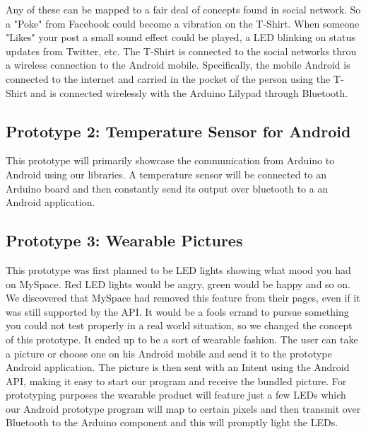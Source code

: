 Any of these can be mapped to a fair deal of concepts found in social network.
So a "Poke" from Facebook could become a vibration on the T-Shirt. When someone "Likes" your post a small sound effect
could be played, a LED blinking on status updates from Twitter, etc. The T-Shirt is connected to the social networks
throu a wireless connection to the Android mobile. Specifically, the mobile Android is connected to the internet
and carried in the pocket of the person using the T-Shirt and is connected wirelessly with the Arduino Lilypad through Bluetooth.
	


	
\subsection{Prototype 2: Temperature Sensor for Android}
This prototype will primarily showcase the communication from Arduino to Android using our libraries.
A temperature sensor will be connected to an Arduino board and then constantly send its output over bluetooth to a
an Android application.
	
\subsection{Prototype 3: Wearable Pictures}
This prototype was first planned to be LED lights showing what mood you had on MySpace. Red LED lights would be angry,
green would be happy and so on. We discovered that MySpace had removed this feature from their pages, even if it was
still supported by the API. It would be a fools errand to pursue something you could not test properly
in a real world situation, so we changed the concept of this prototype. It ended up to be a sort of wearable fashion.
The user can take a picture or choose one on his Android mobile and send it to the prototype Android application.
The picture is then sent with an Intent using the Android API, making it easy to start our program and receive
the bundled picture. For prototyping purposes the wearable product will feature just a few LEDs which our Android
prototype program will map to certain pixels and then transmit over Bluetooth to the Arduino
component and this will promptly light the LEDs.

